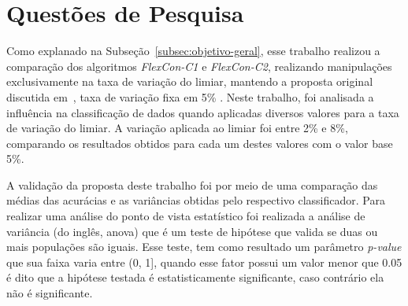 
\section{Questões de Pesquisa}
    \label{sec:questoes-de-pesquisa}


    Como explanado na Subseção~\ref{subsec:objetivo-geral}, esse trabalho realizou a comparação dos algoritmos \textit{FlexCon\hyp{C1}} e \textit{FlexCon\hyp{C2}}, realizando manipulações exclusivamente na taxa de variação do limiar, mantendo a proposta original discutida em~\cite{vale2018selftraining}, taxa de variação fixa em 5\% . Neste trabalho, foi analisada a influência na classificação de dados quando aplicadas diversos valores para a taxa de variação do limiar. A variação aplicada ao limiar foi entre 2\% e 8\%, comparando os resultados obtidos para cada um destes valores com o valor base 5\%.

    A validação da proposta deste trabalho foi por meio de uma comparação das médias das acurácias e as variâncias obtidas pelo respectivo classificador. Para realizar uma análise do ponto de vista estatístico foi realizada a análise de variância (do inglês, \ac{anova}) que é um teste de hipótese que valida se duas ou mais populações são iguais. Esse teste, tem como resultado um parâmetro \textit{p\hyp{value}} que sua faixa varia entre (0, 1], quando esse fator possui um valor menor que 0.05 é dito que a hipótese testada é estatisticamente significante, caso contrário ela não é significante.


